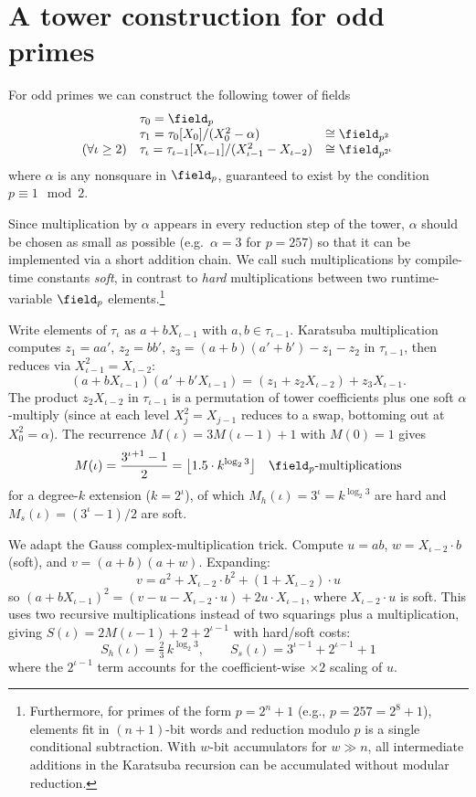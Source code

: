 \section{A tower construction for odd primes}
\label{sec:odd-prime-tower}

For odd primes we can construct the following tower of fields
\[
\begin{array}{lll}
&\tau_0 = \field_p \\
&\tau_1 = \tau_0[X_0]/(X_{0}^2-\alpha) &\cong \field_{p^2} \\
(\forall \iota \geq 2) & \tau_\iota = \tau_{\iota-1}[X_{\iota-1}]/(X_{\iota-1}^2-X_{\iota-2}) &\cong \field_{p^{2^\iota}}
\end{array}
\]
where $\alpha$ is any nonsquare in $\field_p$, guaranteed to exist by the condition $p \equiv 1 \mod 2$.

Since multiplication by $\alpha$ appears in every reduction step of the tower, $\alpha$ should be chosen as small as possible (e.g.\ $\alpha = 3$ for $p = 257$) so that it can be implemented via a short addition chain. We call such multiplications by compile-time constants \emph{soft}, in contrast to \emph{hard} multiplications between two runtime-variable $\field_p$ elements.\footnote{Furthermore, for primes of the form $p=2^n+1$ (e.g., $p=257=2^8+1$), elements fit in $(n+1)$-bit words and reduction modulo $p$ is a single conditional subtraction. With $w$-bit accumulators for $w \gg n$, all intermediate additions in the Karatsuba recursion can be accumulated without modular reduction.}

Write elements of $\tau_\iota$ as $a + bX_{\iota-1}$ with $a,b \in \tau_{\iota-1}$. Karatsuba multiplication computes $z_1 = aa'$, $z_2 = bb'$, $z_3 = (a+b)(a'+b')-z_1-z_2$ in $\tau_{\iota-1}$, then reduces via $X_{\iota-1}^2 = X_{\iota-2}$:
\[
(a+bX_{\iota-1})(a'+b'X_{\iota-1}) = (z_1 + z_2 X_{\iota-2}) + z_3 X_{\iota-1}.
\]
The product $z_2 X_{\iota-2}$ in $\tau_{\iota-1}$ is a permutation of tower coefficients plus one soft $\alpha$-multiply (since at each level $X_j^2 = X_{j-1}$ reduces to a swap, bottoming out at $X_0^2 = \alpha$). The recurrence $M(\iota) = 3M(\iota-1)+1$ with $M(0)=1$ gives
\[
M(\iota) = \frac{3^{\iota+1}-1}{2} = \floor*{1.5 \cdot k^{\log_2 3}} \quad \field_p\text{-multiplications}
\]
for a degree-$k$ extension ($k = 2^\iota$), of which $M_h(\iota)=3^\iota=k^{\log_2 3}$ are hard and $M_s(\iota)=(3^\iota-1)/2$ are soft.

We adapt the Gauss complex-multiplication trick. Compute $u = ab$, $w = X_{\iota-2}\cdot b$ (soft), and $v = (a+b)(a+w)$. Expanding:
\[
v = a^2 + X_{\iota-2}\cdot b^2 + (1+X_{\iota-2})\cdot u
\]
so $(a+bX_{\iota-1})^2 = (v - u - X_{\iota-2}\cdot u) + 2u\cdot X_{\iota-1}$, where $X_{\iota-2}\cdot u$ is soft. This uses two recursive multiplications instead of two squarings plus a multiplication, giving $S(\iota) = 2M(\iota-1)+2+2^{\iota-1}$ with hard/soft costs:
\[
S_h(\iota) = \tfrac{2}{3}\,k^{\log_2 3}, \qquad S_s(\iota) = 3^{\iota-1}+2^{\iota-1}+1
\]
where the $2^{\iota-1}$ term accounts for the coefficient-wise $\times 2$ scaling of $u$.

